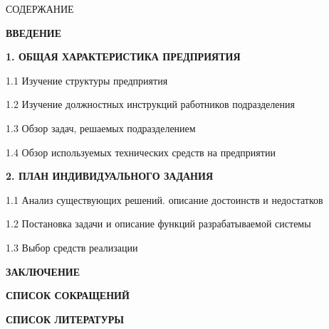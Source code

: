 {\gostTitleFont
    \redline
    СОДЕРЖАНИЕ
} 

\titlespace

{\gostFont
    \par
    \par {\bfseries ВВЕДЕНИЕ }
    \par {\bfseries 1. ОБЩАЯ ХАРАКТЕРИСТИКА ПРЕДПРИЯТИЯ }
    \par 1.1 Изучение структуры предприятия 
    \par 1.2 Изучение должностных инструкций работников подразделения 
    \par 1.3 Обзор задач, решаемых подразделением 
    \par 1.4 Обзор используемых технических средств на предприятии 
    \par {\bfseries 2. ПЛАН ИНДИВИДУАЛЬНОГО ЗАДАНИЯ }
    \par 1.1 Анализ существующих решений. описание достоинств и недостатков 
    \par 1.2 Постановка задачи и описание функций разрабатываемой системы  
    \par 1.3 Выбор средств реализации  
    \par {\bfseries ЗАКЛЮЧЕНИЕ } 
    \par {\bfseries СПИСОК СОКРАЩЕНИЙ } 
    \par {\bfseries СПИСОК ЛИТЕРАТУРЫ } 
    \par 
}